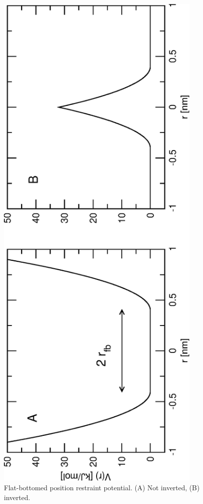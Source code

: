\begin{figure}
\centerline{\includegraphics[width=10cm]{plots/fbposres}}
\caption{Flat-bottomed position restraint potential. (A) Not
  inverted, (B) inverted.}
\label{fig:fbposres}
\end{figure}

